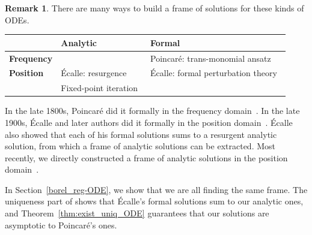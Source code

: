 \documentclass{article}
\theoremstyle{definition}
\newtheorem{remark}[definition]{Remark}
\theoremstyle{plain}
\begin{document}
\begin{remark}
There are many ways to build a frame of solutions for these kinds of ODEs.
\begin{center}
\begin{tabular}{l|l|l}
& \textbf{Analytic} & \textbf{Formal} \\ \hline
\textbf{Frequency} &  & Poincar\'{e}: trans-monomial ansatz~\cite{int-irreg} \\ \hline
\textbf{Position} & \'{E}calle: resurgence  & \'{E}calle: formal perturbation theory~\cite{EcalleIII,loday-Remy2011} \\
& Fixed-point iteration~\cite{reg-sing-volterra} \\
\end{tabular}
\end{center}
In the late 1800s, Poincar\'{e} did it formally in the frequency domain~\cite{int-irreg}. In the late 1900s, \'{E}calle and later authors did it formally in the position domain~\cite{EcalleIII,loday-Remy2011}. \'{E}calle also showed that each of his formal solutions sums to a resurgent analytic solution, from which a frame of analytic solutions can be extracted. Most recently, we directly constructed a frame of analytic solutions in the position domain~\cite{reg-sing-volterra}.

In Section~\ref{borel_reg-ODE}, we show that we are all finding the same frame. The uniqueness part of \cite[Theorem~4]{reg-sing-volterra} shows that \'{E}calle's formal solutions sum to our analytic ones, and Theorem~\ref{thm:exist_uniq_ODE} guarantees that our solutions are asymptotic to Poincar\'{e}'s ones.
\end{remark} 
%
%
%
\end{document}
